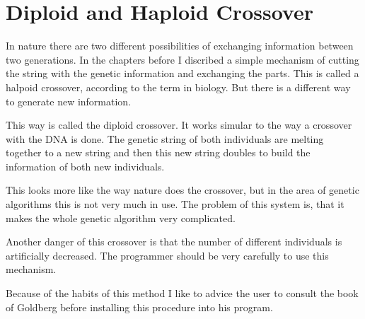 \section{Diploid and Haploid Crossover}
In nature there are two different possibilities of exchanging information between
two generations. In the chapters before I discribed a simple mechanism of cutting
the string with the genetic information and exchanging the parts. This is called
a halpoid crossover, according to the term in biology. But there is a different
way to generate new information.

This way is called the diploid crossover. It works simular to the way a crossover
with the DNA is done. The genetic string of both individuals are melting together
to a new string and then this new string doubles to build the information of
both new individuals.

This looks more like the way nature does the crossover, but in the area of genetic
algorithms this is not very much in use. The problem of this system is, that
it makes the whole genetic algorithm very complicated.

Another danger of this crossover is that the number of different individuals is
artificially decreased. The programmer should be very carefully to use this
mechanism.

Because of the habits of this method I like to advice the user to consult the
book of Goldberg\cite{Gol89} before installing this procedure into his program.